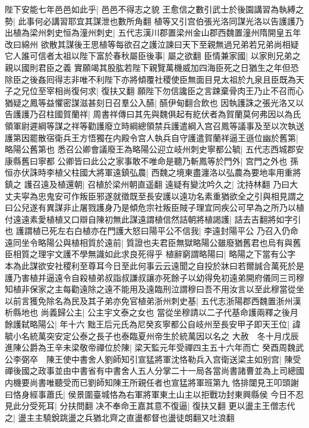 陛下安能七年邑邑如此乎|{
	邑邑不得志之貌}
王愈信之數引武士於後園講習為執縛之勢|{
	此事何必講習耶宜其謀泄也數所角翻}
植等又引宫伯張光洛同謀光洛以告護護乃出植為梁州刺史恒為潼州刺史|{
	五代志漢川郡置梁州金山郡西魏置潼州隋開皇五年改曰綿州}
欲散其謀後王思植等每欲召之護泣諫曰天下至親無過兄弟若兄弟尚相疑它人誰可信者太祖以陛下富於春秋屬臣後事|{
	屬之欲翻}
臣情兼家國|{
	以家則兄弟之親以國則君臣之義}
實願竭其股肱若陛下親覽萬機威加四海臣死之日猶生之年但恐除臣之後姦囘得志非唯不利陛下亦將傾覆社稷使臣無面目見太祖於九泉且臣既為天子之兄位至宰相尚復何求|{
	復扶又翻}
願陛下勿信讒臣之言踈棄骨肉王乃止不召而心猶疑之鳳等益懼密謀滋甚刻日召羣公入醼|{
	醼伊甸翻合飲也}
因執護誅之張光洛又以告護護乃召柱國賀蘭祥|{
	周書祥傳曰其先與魏俱起有紇伏者為賀蘭莫何弗因以為氏}
領軍尉遲綱等謀之祥等勸護廢立時綱總領禁兵護遣綱入宫召鳳等議事及至以次執送護第因罷散宿衛兵王方悟獨在内殿令宫人執兵自守護遣賀蘭祥逼王遜位幽於舊第|{
	略陽公舊第也}
悉召公卿會議廢王為略陽公迎立岐州刺史寧都公毓|{
	五代志西城郡安康縣舊曰寧都}
公卿皆曰此公之家事敢不唯命是聽乃斬鳳等於門外|{
	宫門之外也}
孫恒亦伏誅時李植父柱國大將軍遠鎮弘農|{
	西魏之境東盡瀍洛以弘農為要地率用重將鎮之}
護召遠及植還朝|{
	召植於梁州朝直遥翻}
遠疑有變沈吟久之|{
	沈持林翻}
乃曰大丈夫寜為忠鬼安可作叛臣邪遂就徵既至長安護以遠功名素重猶欲全之引與相見謂之曰公兒遂有異謀非止屠戮護身乃是傾危宗社叛臣賊子理宜同疾公可早為之所乃以植付遠遠素愛植植又口辯自陳初無此謀遠謂植信然詰朝將植謁護|{
	詰去吉翻將如字引也}
護謂植已死左右白植亦在門護大怒曰陽平公不信我|{
	李遠封陽平公}
乃召入仍命遠同坐令略陽公與植相質於遠前|{
	質證也夫君臣無獄略陽公雖廢猶舊君也烏有與舊臣相質之理宇文護不學無識如此求良死得乎}
植辭窮謂略陽曰|{
	略陽之下當有公字}
本為此謀欲安社稷利至尊耳今日至此何事云云遠聞之自投於牀曰若爾誠合萬死於是護乃害植并逼遠令自殺植弟叔詣叔謙叔讓亦死餘子以幼得免初遠弟開府儀同三司穆知植非保家之主每勸遠除之遠不能用及遠臨刑泣謂穆曰吾不用汝言以至此穆當從坐以前言獲免除名為民及其子弟亦免官植弟浙州刺史基|{
	五代志浙陽郡西魏置浙州漢析縣地也}
尚義歸公主|{
	公主宇文泰之女也}
當從坐穆請以二子代基命護兩釋之後月餘護弑略陽公|{
	年十六}
黜王后元氏為尼癸亥寧都公自岐州至長安甲子即天王位|{
	諱毓小名統萬突安定公泰之長子也泰臨夏州帝生於統萬因以名之}
大赦　冬十月戊辰進陳公爵為王辛未梁敬帝禪位於陳|{
	梁天監元年受禪四主五十六年而亡}
癸酉周魏武公李弼卒　陳王使中書舍人劉師知引宣猛將軍沈恪勒兵入宫衛送梁主如别宫|{
	陳受禪後國之政事並由中書省有中書舍人五人分掌二十一局各當尚書諸曹並為上司總國内機要尚書唯聽受而已劉師知陳王所親任者也宣猛將軍班第九}
恪排闥見王叩頭謝曰恪身經事蕭氏|{
	侯景圍臺城恪為右軍將軍東土山主以拒戰功封東興縣侯}
今日不忍見此分受死耳|{
	分扶問翻}
决不奉命王嘉其意不復逼|{
	復扶又翻}
更以盪主王僧志代之|{
	盪主主驍銳跳盪之兵猶北齊之直盪都督也盪徒朗翻又吐浪翻}

